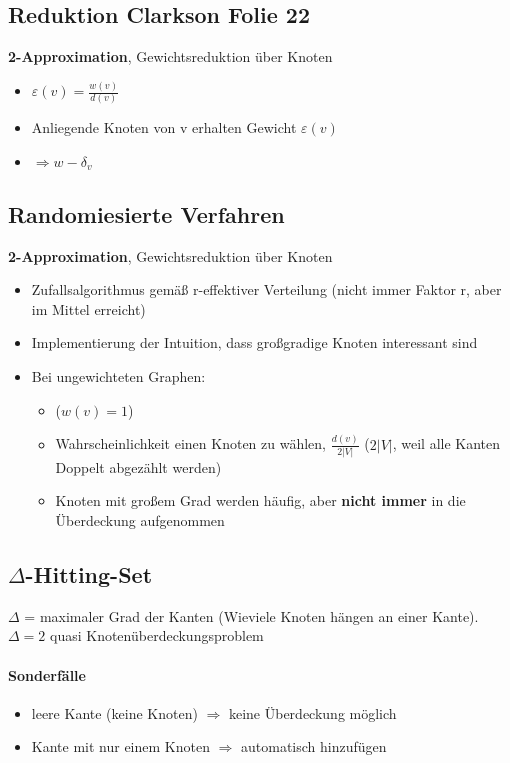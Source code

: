 \documentclass[ngerman]{scrartcl}
\begin{document}
\subsection{Reduktion Clarkson Folie 22}
\textbf{2-Approximation}, Gewichtsreduktion über Knoten
\begin{itemize}
  \item $ \varepsilon (v) = \frac{w(v)}{d(v)}$
  \item Anliegende Knoten von v erhalten Gewicht $ \varepsilon(v) $
  \item $ \Rightarrow w - \delta_v $
\end{itemize} 

\subsection{Randomiesierte Verfahren}
\textbf{2-Approximation}, Gewichtsreduktion über Knoten
\begin{itemize}
  \item Zufallsalgorithmus gemäß r-effektiver Verteilung (nicht immer Faktor r, aber im Mittel erreicht)
  \item Implementierung der Intuition, dass großgradige Knoten interessant sind
  \item Bei ungewichteten Graphen:
  \begin{itemize}
    \item ($ w(v) = 1 $)
    \item Wahrscheinlichkeit einen Knoten zu wählen, $ \frac{d(v)}{2|V|} $ ($ 2|V| $, weil alle Kanten Doppelt abgezählt werden)
    \item Knoten mit großem Grad werden häufig, aber \textbf{nicht immer} in die Überdeckung aufgenommen
  \end{itemize}
\end{itemize}


\subsection{$\Delta$-Hitting-Set}
$\Delta$ = maximaler Grad der Kanten (Wieviele Knoten hängen an einer Kante). $ \Delta = 2 $ quasi Knotenüberdeckungsproblem
\paragraph{Sonderfälle}
\begin{itemize}
  \item leere Kante (keine Knoten) $ \Rightarrow $ keine Überdeckung möglich
  \item Kante mit nur einem Knoten $ \Rightarrow $ automatisch hinzufügen
\end{itemize}
\end{document}
